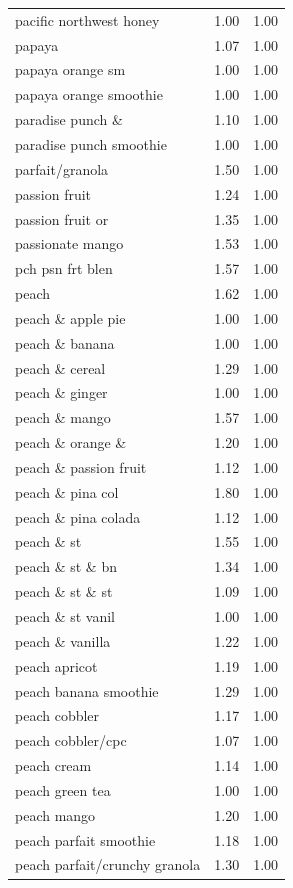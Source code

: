 \begin{table}
\begin{tabular}{lrr}
pacific northwest honey & 1.00 & 1.00 \\
papaya & 1.07 & 1.00 \\
papaya orange sm & 1.00 & 1.00 \\
papaya orange smoothie & 1.00 & 1.00 \\
paradise punch \& & 1.10 & 1.00 \\
paradise punch smoothie & 1.00 & 1.00 \\
parfait/granola & 1.50 & 1.00 \\
passion fruit & 1.24 & 1.00 \\
passion fruit or & 1.35 & 1.00 \\
passionate mango & 1.53 & 1.00 \\
pch psn frt blen & 1.57 & 1.00 \\
peach & 1.62 & 1.00 \\
peach \& apple pie & 1.00 & 1.00 \\
peach \& banana & 1.00 & 1.00 \\
peach \& cereal & 1.29 & 1.00 \\
peach \& ginger & 1.00 & 1.00 \\
peach \& mango & 1.57 & 1.00 \\
peach \& orange \& & 1.20 & 1.00 \\
peach \& passion fruit & 1.12 & 1.00 \\
peach \& pina col & 1.80 & 1.00 \\
peach \& pina colada & 1.12 & 1.00 \\
peach \& st & 1.55 & 1.00 \\
peach \& st \& bn & 1.34 & 1.00 \\
peach \& st \& st & 1.09 & 1.00 \\
peach \& st vanil & 1.00 & 1.00 \\
peach \& vanilla & 1.22 & 1.00 \\
peach apricot & 1.19 & 1.00 \\
peach banana smoothie & 1.29 & 1.00 \\
peach cobbler & 1.17 & 1.00 \\
peach cobbler/cpc & 1.07 & 1.00 \\
peach cream & 1.14 & 1.00 \\
peach green tea & 1.00 & 1.00 \\
peach mango & 1.20 & 1.00 \\
peach parfait smoothie & 1.18 & 1.00 \\
peach parfait/crunchy granola & 1.30 & 1.00 \\

\end{tabular}
\end{table}
